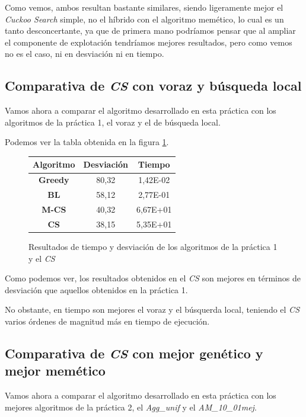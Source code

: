Como vemos, ambos resultan bastante similares, siendo ligeramente mejor el \textit{Cuckoo Search} simple, no el híbrido con el algoritmo memético, lo cual es un tanto desconcertante, ya que de primera mano podríamos pensar que al ampliar el componente de explotación tendríamos mejores resultados, pero como vemos no es el caso, ni en desviación ni en tiempo.

\subsection{Comparativa de \textit{CS} con voraz y búsqueda local}

Vamos ahora a comparar el algoritmo desarrollado en esta práctica con los algoritmos de la práctica 1, el voraz y el de búsqueda local.

Podemos ver la tabla obtenida en la figura \ref{tab:compP1}.

\begin{figure}[H]
    \centering
    \begin{tabular}{|c|c|c|}
        \hline
        Algoritmo & \textbf{Desviación} & \textbf{Tiempo}\\
        \hline
        \textbf{Greedy} & 80,32 & 1,42E-02\\
        \hline
        \textbf{BL} & 58,12 & 2,77E-01\\
        \hline
        \textbf{M-CS} & 40,32 & 6,67E+01\\
        \hline
        \textbf{CS} & 38,15 & 5,35E+01\\
        \hline
    \end{tabular}
    \caption{Resultados de tiempo y desviación de los algoritmos de la práctica 1 y el \textit{CS}}
    \label{tab:compP1}
\end{figure}

Como podemos ver, los resultados obtenidos en el \textit{CS} son mejores en términos de desviación que aquellos obtenidos en la práctica 1.

No obstante, en tiempo son mejores el voraz y el búsquerda local, teniendo el \textit{CS} varios órdenes de magnitud más en tiempo de ejecución. 

\subsection{Comparativa de \textit{CS} con mejor genético y mejor memético}

Vamos ahora a comparar el algoritmo desarrollado en esta práctica con los mejores algoritmos de la práctica 2, el \textit{Agg\_unif} y el \textit{AM\_10\_01mej}.


